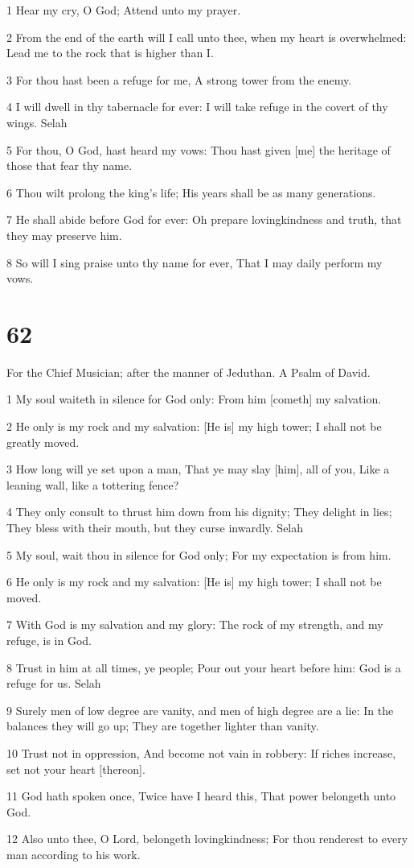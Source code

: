 \par 1 Hear my cry, O God; Attend unto my prayer.
\par 2 From the end of the earth will I call unto thee, when my heart is overwhelmed: Lead me to the rock that is higher than I.
\par 3 For thou hast been a refuge for me, A strong tower from the enemy.
\par 4 I will dwell in thy tabernacle for ever: I will take refuge in the covert of thy wings. Selah
\par 5 For thou, O God, hast heard my vows: Thou hast given [me] the heritage of those that fear thy name.
\par 6 Thou wilt prolong the king's life; His years shall be as many generations.
\par 7 He shall abide before God for ever: Oh prepare lovingkindness and truth, that they may preserve him.
\par 8 So will I sing praise unto thy name for ever, That I may daily perform my vows.

\chapter{62}

\par For the Chief Musician; after the manner of Jeduthan. A Psalm of David.

\par 1 My soul waiteth in silence for God only: From him [cometh] my salvation.
\par 2 He only is my rock and my salvation: [He is] my high tower; I shall not be greatly moved.
\par 3 How long will ye set upon a man, That ye may slay [him], all of you, Like a leaning wall, like a tottering fence?
\par 4 They only consult to thrust him down from his dignity; They delight in lies; They bless with their mouth, but they curse inwardly. Selah
\par 5 My soul, wait thou in silence for God only; For my expectation is from him.
\par 6 He only is my rock and my salvation: [He is] my high tower; I shall not be moved.
\par 7 With God is my salvation and my glory: The rock of my strength, and my refuge, is in God.
\par 8 Trust in him at all times, ye people; Pour out your heart before him: God is a refuge for us. Selah
\par 9 Surely men of low degree are vanity, and men of high degree are a lie: In the balances they will go up; They are together lighter than vanity.
\par 10 Trust not in oppression, And become not vain in robbery: If riches increase, set not your heart [thereon].
\par 11 God hath spoken once, Twice have I heard this, That power belongeth unto God.
\par 12 Also unto thee, O Lord, belongeth lovingkindness; For thou renderest to every man according to his work.

